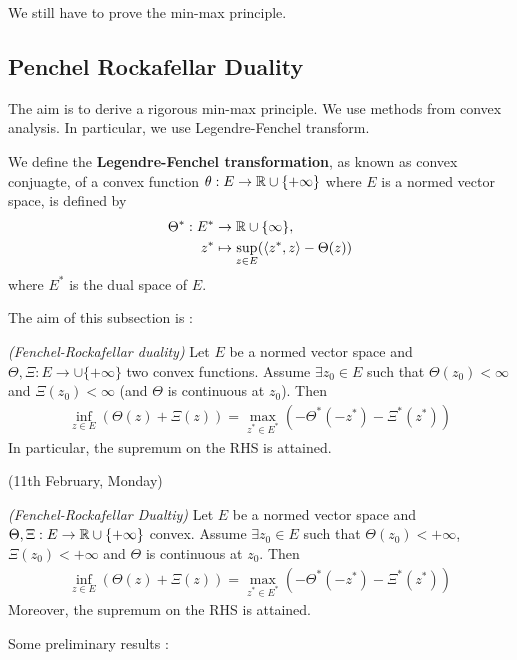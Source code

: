 \documentclass[12pt,a4paper]{article}
\begin{document}
We still have to prove the min-max principle.

\subsection{Penchel Rockafellar Duality}

The aim is to derive a rigorous min-max principle. We use methods from convex analysis. In particular, we use Legendre-Fenchel transform.
\s

 We define the \textbf{Legendre-Fenchel transformation}, as known as convex conjuagte, of a convex function $\theta : E\rightarrow \mathbb{R} \cup \{+\infty \}$ where $E$ is a normed vector space, is defined by
\begin{align*}
\Theta^* : E^* &\rightarrow \mathbb{R} \cup \{\infty \},\\
z^* &\mapsto \sup_{z\in E}(\langle z^*, z\rangle - \Theta(z))
\end{align*}
where $E^*$ is the dual space of $E$.
\s

The aim of this subsection is : 
\s

 \emph{(Fenchel-Rockafellar duality)} Let $E$ be a normed vector space and $\Theta, \Xi : E\rightarrow \cup \{+ \infty \}$ two convex functions. Assume $\exists z_0 \in E$ such that $\Theta(z_0) < \infty$ and $\Xi(z_0) < \infty$ (and $\Theta$ is continuous at $z_0$). Then
\begin{align*}
\inf_{z\in E} (\Theta(z) + \Xi(z)) = \max_{z^*\in E^*} (-\Theta^*(-z^*) - \Xi^*(z^*))
\end{align*}
In particular, the supremum on the RHS is attained. 
\s

\newday

(11th February, Monday)
\s

 \emph{(Fenchel-Rockafellar Dualtiy)} Let $E$ be a normed vector space and $\Theta, \Xi : E\rightarrow \mathbb{R} \cup \{+ \infty \}$ convex. Assume $\exists z_0 \in E$ such that $\Theta(z_0 )< + \infty$, $\Xi(z_0) < +\infty$ and $\Theta$ is continuous at $z_0$. Then
\begin{align*}
\inf_{z\in E} (\Theta (z) + \Xi(z)) = \max_{z^* \in E^*} (- \Theta^*(-z^*) - \Xi^*(z^*)) 
\end{align*}
Moreover, the supremum on the RHS is attained.
\s

Some preliminary results : 
\s
\end{document}
